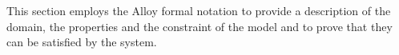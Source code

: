 This section employs the Alloy formal notation to provide a description of the domain,
the properties and the constraint of the model and to prove that they can be satisfied by the system.